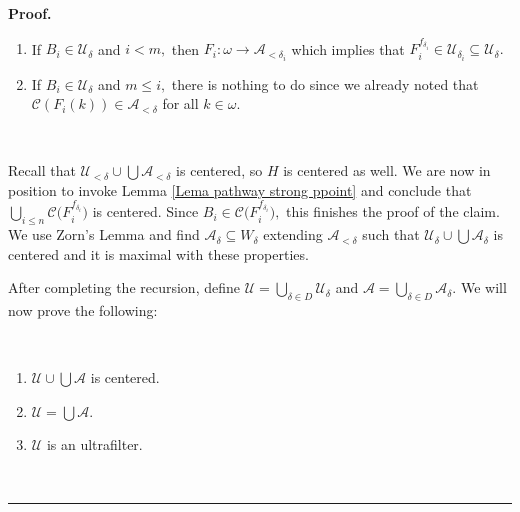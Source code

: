 \documentclass[10pt,a4paper]{amsart}
\newenvironment{proof}[1][Proof]{\noindent\textbf{#1.} }{\ \rule{0.5em}{0.5em}}
\begin{document}
\begin{proof}
\begin{enumerate}
\item If $B_{i}\in\mathcal{U}_{\delta}$ and $i<m,$ then $F_{i}:\omega
\longrightarrow\mathcal{A}_{<\delta_{i}}$ which implies that $F_{i}%
^{f_{\delta_{i}}}\in\mathcal{U}_{\delta_{i}}\subseteq\mathcal{U}_{\delta}.$

\item If $B_{i}\in\mathcal{U}_{\delta}$ and $m\leq i,$ there is nothing to do
since we already noted that $\mathcal{C}\left(  F_{i}\left(  k\right)
\right)  \in\mathcal{A}_{<\delta}$ for all $k\in\omega.$
\end{enumerate}

\qquad\ \ \ \ 

Recall that $\mathcal{U}_{<\delta}\cup%
{\textstyle\bigcup}
\mathcal{A}_{<\delta}$ is centered, so $H$ is centered as well. We are now in
position to invoke Lemma \ref{Lema pathway strong ppoint} and conclude that $%
{\textstyle\bigcup\limits_{i\leq n}}
\mathcal{C(}F_{i}^{f_{\delta_{i}}})$ is centered. Since $B_{i}\in
\mathcal{C(}F_{i}^{f_{\delta_{i}}}),$ this finishes the proof of the claim. We
use Zorn's Lemma and find $\mathcal{A}_{\delta}\subseteq W_{\delta}$ extending
$\mathcal{A}_{<\delta}$ such that $\mathcal{U}_{\delta}\cup%
{\textstyle\bigcup}
\mathcal{A}_{\delta}$ is centered and it is maximal with these properties.

\qquad\qquad\qquad

After completing the recursion, define $\mathcal{U=}%
{\textstyle\bigcup\limits_{\delta\in D}}
\mathcal{U}_{\delta}$ and $\mathcal{A=}%
{\textstyle\bigcup\limits_{\delta\in D}}
\mathcal{A}_{\delta}.$ We will now prove the following:

\begin{claim}
\qquad\ \ \ 

\begin{enumerate}
\item $\mathcal{U\cup}%
{\textstyle\bigcup}
\mathcal{A}$ is centered.

\item $\mathcal{U}=%
{\textstyle\bigcup}
\mathcal{A}.$

\item $\mathcal{U}$ is an ultrafilter.


\end{enumerate}
\end{claim}
\end{proof}
\end{document}
